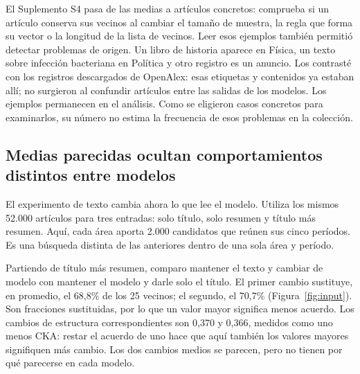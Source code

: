 \documentclass[12pt]{article}
\begin{document}
El Suplemento S4 pasa de las medias a artículos concretos: comprueba si un artículo conserva sus vecinos al cambiar el tamaño de muestra, la regla que forma su vector o la longitud de la lista de vecinos. Leer esos ejemplos también permitió detectar problemas de origen. Un libro de historia aparece en Física, un texto sobre infección bacteriana en Política y otro registro es un anuncio. Los contrasté con los registros descargados de OpenAlex: esas etiquetas y contenidos ya estaban allí; no surgieron al confundir artículos entre las salidas de los modelos. Los ejemplos permanecen en el análisis. Como se eligieron casos concretos para examinarlos, su número no estima la frecuencia de esos problemas en la colección.

\FloatBarrier
\subsection{Medias parecidas ocultan comportamientos distintos entre modelos}
El experimento de texto cambia ahora lo que lee el modelo. Utiliza los mismos 52.000 artículos para tres entradas: solo título, solo resumen y título más resumen. Aquí, cada área aporta 2.000 candidatos que reúnen sus cinco períodos. Es una búsqueda distinta de las anteriores dentro de una sola área y período.

Partiendo de título más resumen, comparo mantener el texto y cambiar de modelo con mantener el modelo y darle solo el título. El primer cambio sustituye, en promedio, el 68,8\% de los 25 vecinos; el segundo, el 70,7\% (Figura~\ref{fig:input}). Son fracciones sustituidas, por lo que un valor mayor significa menos acuerdo. Los cambios de estructura correspondientes son 0,370 y 0,366, medidos como uno menos CKA: restar el acuerdo de uno hace que aquí también los valores mayores signifiquen más cambio. Los dos cambios medios se parecen, pero no tienen por qué parecerse en cada modelo.
\end{document}
